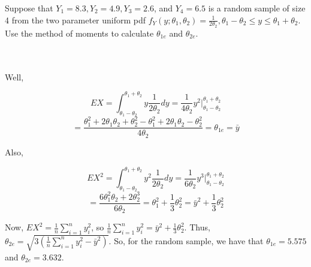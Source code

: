 Suppose that $Y_1 = 8.3, Y_2 = 4.9, Y_3 = 2.6$, and $Y_4 = 6.5$ is a random sample of size 4 from the
two parameter uniform pdf
$f_Y(y; \theta_1, \theta_2)=\frac{1}{2\theta_2}, \theta_1-\theta_2\leq y\leq\theta_1+\theta_2$. Use the
method of moments to calculate $\theta_{1e}$ and $\theta_{2e}$.\\\\

\begin{solution}\renewcommand{\qedsymbol}{}\ \\
    Well,
    
    $$EX=\int_{\theta_1-\theta_2}^{\theta_1+\theta_2}y\frac{1}{2\theta_2}dy=
    \frac{1}{4\theta_2}y^2|_{\theta_1-\theta_2}^{\theta_1+\theta_2}$$
    $$=\frac{\theta_1^2+2\theta_1\theta_2+\theta_2^2-\theta_1^2+2\theta_1\theta_2-\theta_2^2}{4\theta_2}
    =\theta_{1e}=\bar{y}$$
    
    Also,
    
    $$EX^2=\int_{\theta_1-\theta_2}^{\theta_1+\theta_2}y^2\frac{1}{2\theta_2}dy
    =\frac{1}{6\theta_2}y^3|_{\theta_1-\theta_2}^{\theta_1+\theta_2}$$
    $$=\frac{6\theta_1^2\theta_2+2\theta_2^3}{6\theta_2}=\theta_1^2+\frac13\theta_2^2
    =\bar{y}^2+\frac13\theta_2^2$$
    
    Now, $EX^2=\frac1n\sum_{i=1}^ny_i^2$, so $\frac1n\sum_{i=1}^ny_i^2=\bar{y}^2+\frac13\theta_2^2$.
    Thus, $\theta_{2e}=\sqrt{3(\frac1n\sum_{i=1}^ny_i^2-\bar{y}^2)}$. So, for the random sample, we
    have that $\theta_{1e}=5.575$ and $\theta_{2e}=3.632$.

\end{solution}